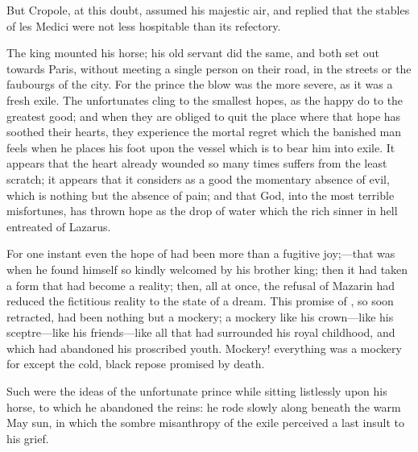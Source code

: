 But Cropole, at this doubt, assumed his majestic air, and replied that the stables of les Medici were not less hospitable than its refectory.

The king mounted his horse; his old servant did the same, and both set out towards Paris, without meeting a single person on their road, in the streets or the faubourgs of the city. For the prince the blow was the more severe, as it was a fresh exile. The unfortunates cling to the smallest hopes, as the happy do to the greatest good; and when they are obliged to quit the place where that hope has soothed their hearts, they experience the mortal regret which the banished man feels when he places his foot upon the vessel which is to bear him into exile. It appears that the heart already wounded so many times suffers from the least scratch; it appears that it considers as a good the momentary absence of evil, which is nothing but the absence of pain; and that God, into the most terrible misfortunes, has thrown hope as the drop of water which the rich sinner in hell entreated of Lazarus.

For one instant even the hope of  had been more than a fugitive joy;—that was when he found himself so kindly welcomed by his brother king; then it had taken a form that had become a reality; then, all at once, the refusal of Mazarin had reduced the fictitious reality to the state of a dream. This promise of , so soon retracted, had been nothing but a mockery; a mockery like his crown—like his sceptre—like his friends—like all that had surrounded his royal childhood, and which had abandoned his proscribed youth. Mockery! everything was a mockery for  except the cold, black repose promised by death.

Such were the ideas of the unfortunate prince while sitting listlessly upon his horse, to which he abandoned the reins: he rode slowly along beneath the warm May sun, in which the sombre misanthropy of the exile perceived a last insult to his grief. 